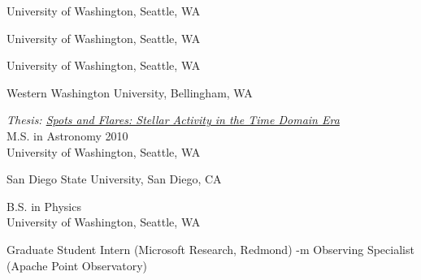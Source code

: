 \documentclass{article}
\begin{document}
\begin{llist}
\vspace{-0.1in}


\sectiontitle{}
\location{}
University of Washington, Seattle, WA





University of Washington, Seattle, WA

University of Washington, Seattle, WA

 Western Washington University, Bellingham, WA




{\it Thesis: \href{http://hdl.handle.net/1773/33558}{{\color{blue} Spots and Flares: Stellar Activity in the Time Domain Era}
}}\\
{\sc M.S. in Astronomy} \hfill 2010\\
University of Washington, Seattle, WA

San Diego State University, San Diego, CA

{\sc B.S. in Physics}\\
University of Washington, Seattle, WA


{\sc Graduate Student Intern} (Microsoft Research, Redmond) 
{-m Observing Specialist} (Apache Point Observatory) 





\end{llist}
\end{document}

